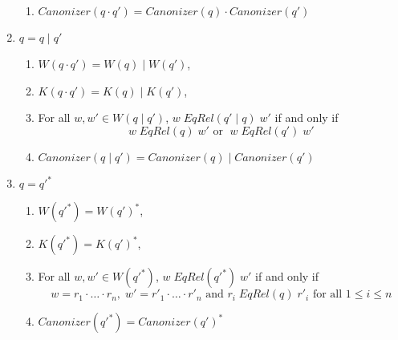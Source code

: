 \documentclass{svproc}
\newcommand{\sep}{\ensuremath{\; | \;}}
\begin{document}
\begin{enumerate}
\begin{center}
\begin{enumerate}
\item
$Canonizer(q \cdot q') = Canonizer(q) \cdot Canonizer(q')
$
\end{enumerate}
\begin{prooftree}
\end{prooftree}
\end{center}
\item $q=q \sep  q'$
\begin{center}
\begin{enumerate}
  \item $W(q \cdot q') = W(q) \sep W(q')$,
  \item $K(q \cdot q') = K(q) \sep K(q')$, 
  \item
For all $w, w' \in W(q \sep q')$, $w \; EqRel(q' \sep q) \; w'$ if and
only if 
$$w \; EqRel(q) \; w' \text{ or } \; w \; EqRel(q') \; w'$$
\item
$Canonizer(q \sep q') = Canonizer(q) \sep Canonizer(q')
$
\end{enumerate}
\begin{prooftree}
\end{prooftree}
\end{center}
\item $q=q'^*$
\begin{center}
\begin{enumerate}
  \item $W(q'^*) = W(q')^*$,
  \item $K(q'^*) = K(q')^*$, 
  \item
For all $w, w' \in W(q'^*)$, $w \; EqRel(q'^*) \; w'$ if and
only if 
$$w = r_1 \cdot \ldots \cdot r_n, \; w' = {r'}_1 \cdot \ldots
      \cdot {r'}_n \text{ and } r_i \; EqRel(q) \; {r'}_i
      \text{ for all } 1 \leq i \leq n$$
      \item
$Canonizer(q'^*) = Canonizer(q')^* $
\end{enumerate}
\begin{prooftree}
\end{prooftree}
\end{center}
\end{enumerate}
\end{document}

